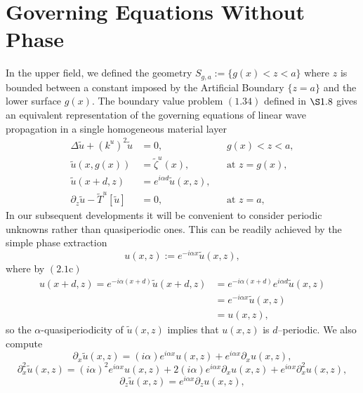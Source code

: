 \section{Governing Equations Without Phase}
\label{intro:governing_equations_without_phase}
In the upper field, we defined the geometry $S_{g,a}:=\{g(x)<z<a\}$ where $z$ is bounded between a constant imposed by the Artificial Boundary $\{z=a\}$ and the lower surface $g(x)$. The boundary value problem $(1.34)$ defined in $\S1.8$ gives an equivalent representation of the governing equations of linear wave propagation in a single homogeneous material layer 
\begin{subequations}
\begin{align}
\Delta \tilde{u} + (k^u)^2 \tilde{u} &=0,&& \text{$g(x)<z<a$},\\
\tilde{u}(x,g(x))&=\tilde{\zeta}^u(x),&& \text{at $z=g(x)$},\\
\tilde{u}(x+d,z)&=e^{i\alpha d}\tilde{u}(x,z),\\
\partial_z \tilde{u} - \tilde{T}^u[\tilde{u}]&=0,&&  \text{at $z=a$,}
\end{align}
\end{subequations}
In our subsequent developments it will be convenient to consider periodic unknowns rather than quasiperiodic ones. This can be readily achieved by the simple phase extraction
\begin{equation}u(x,z):= e^{-i\alpha x}\tilde{u}(x,z),\end{equation}
where by $(2.1\text{c})$
\begin{align*}u(x+d,z)=e^{-i\alpha(x+d)}\tilde{u}(x+d,z)&=
e^{-i\alpha(x+d)}e^{i\alpha d}\tilde{u}(x,z)\\&=
e^{-i\alpha x}\tilde{u}(x,z)\\&=
u(x,z),
\end{align*}
so the $\alpha$-quasiperiodicity of $\tilde{u}(x,z)$ implies that ${u(x,z)}$ is $d$--periodic. We also compute
\begin{equation*}\partial_x \tilde{u}(x,z) = (i\alpha)e^{i\alpha x}u(x,z)+e^{i\alpha x}\partial_x u(x,z),\end{equation*}
\begin{equation*}\partial_x^2 \tilde{u}(x,z) = (i\alpha)^2e^{i\alpha x}u(x,z)+2(i\alpha)e^{i\alpha x}\partial_x u(x,z)+e^{i\alpha x}\partial_x^2 u(x,z),\end{equation*}
\begin{equation*}\partial_z \tilde{u}(x,z) = e^{i\alpha x}\partial_z u(x,z),\end{equation*}
